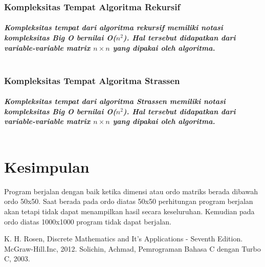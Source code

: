 \documentclass[conference]{IEEEtran}
\begin{document}
\subsubsection{Kompleksitas Tempat Algoritma Rekursif}
\paragraph*{
    \emph{Kompleksitas tempat dari algoritma rekursif memiliki notasi kompleksitas Big O bernilai O($n^{2}$). 
    Hal tersebut didapatkan dari variable-variable matrix $n \times n$ yang dipakai oleh algoritma.\\\\}
}


\subsubsection{Kompleksitas Tempat Algoritma Strassen}
\paragraph*{
    \emph{Kompleksitas tempat dari algoritma Strassen memiliki notasi kompleksitas Big O bernilai O($n^{2}$). 
    Hal tersebut didapatkan dari variable-variable matrix $n \times n$ yang dipakai oleh algoritma.\\\\}
}

\section{Kesimpulan}
Program berjalan dengan baik ketika dimensi atau ordo matriks berada dibawah ordo 50x50. Saat berada pada ordo diatas 50x50 perhitungan program berjalan akan tetapi tidak dapat menampilkan hasil secara keseluruhan. Kemudian pada ordo diatas 1000x1000 program tidak dapat berjalan.

\begin{thebibliography}{00}
     K. H. Rosen, Discrete Mathematics and It’s Applications - Seventh
    Edition. McGraw-Hill.Inc, 2012.
     Solichin, Achmad, Pemrograman Bahasa C dengan Turbo C, 2003.
    \end{thebibliography}
\end{document}
